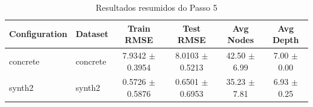 \begin{table}[htbp]
  \centering
  \caption{Resultados resumidos do Passo 5}
  \label{tab:step5}
  \begin{tabular}{llcccc}
    \toprule
    Configuration & Dataset & Train RMSE & Test RMSE & Avg Nodes & Avg Depth \\
    \midrule
    concrete & concrete & 7.9342 $\pm$ 0.3954 & 8.0103 $\pm$ 0.5213 & 42.50 $\pm$ 6.99 & 7.00 $\pm$ 0.00 \\
    synth2 & synth2 & 0.5726 $\pm$ 0.5876 & 0.6501 $\pm$ 0.6953 & 35.23 $\pm$ 7.81 & 6.93 $\pm$ 0.25 \\
    \bottomrule
  \end{tabular}
\end{table}

